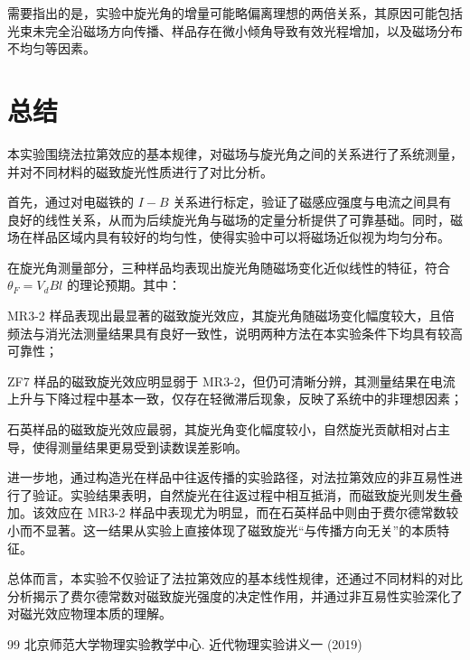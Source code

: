 \documentclass[a4paper, 1.5lines]{ctexart}
\begin{document}
需要指出的是，实验中旋光角的增量可能略偏离理想的两倍关系，其原因可能包括光束未完全沿磁场方向传播、样品存在微小倾角导致有效光程增加，以及磁场分布不均匀等因素。

\section{总结}

本实验围绕法拉第效应的基本规律，对磁场与旋光角之间的关系进行了系统测量，并对不同材料的磁致旋光性质进行了对比分析。

首先，通过对电磁铁的 $I-B$ 关系进行标定，验证了磁感应强度与电流之间具有良好的线性关系，从而为后续旋光角与磁场的定量分析提供了可靠基础。同时，磁场在样品区域内具有较好的均匀性，使得实验中可以将磁场近似视为均匀分布。

在旋光角测量部分，三种样品均表现出旋光角随磁场变化近似线性的特征，符合 $\theta_F = V_d B l$ 的理论预期。其中：

MR3-2 样品表现出最显著的磁致旋光效应，其旋光角随磁场变化幅度较大，且倍频法与消光法测量结果具有良好一致性，说明两种方法在本实验条件下均具有较高可靠性；

ZF7 样品的磁致旋光效应明显弱于 MR3-2，但仍可清晰分辨，其测量结果在电流上升与下降过程中基本一致，仅存在轻微滞后现象，反映了系统中的非理想因素；

石英样品的磁致旋光效应最弱，其旋光角变化幅度较小，自然旋光贡献相对占主导，使得测量结果更易受到读数误差影响。

进一步地，通过构造光在样品中往返传播的实验路径，对法拉第效应的非互易性进行了验证。实验结果表明，自然旋光在往返过程中相互抵消，而磁致旋光则发生叠加。该效应在 MR3-2 样品中表现尤为明显，而在石英样品中则由于费尔德常数较小而不显著。这一结果从实验上直接体现了磁致旋光“与传播方向无关”的本质特征。

总体而言，本实验不仅验证了法拉第效应的基本线性规律，还通过不同材料的对比分析揭示了费尔德常数对磁致旋光强度的决定性作用，并通过非互易性实验深化了对磁光效应物理本质的理解。
    \begin{thebibliography}{99}
        北京师范大学物理实验教学中心. 近代物理实验讲义一 (2019)
    \end{thebibliography}
\end{document}
